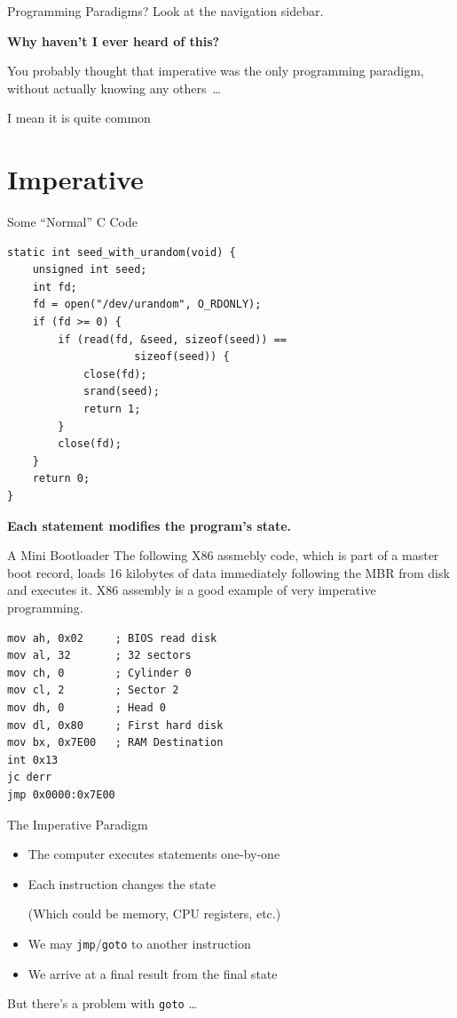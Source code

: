 \documentclass[aspectratio=169]{beamer}
\begin{document}
\begin{frame}{Programming Paradigms?}
	Look at the navigation sidebar.\pause

	\Large\textbf{Why haven't I ever heard of this?}

	\pause\normalsize

	You probably thought that imperative was the only programming paradigm, without actually knowing any others~\ldots

	\pause

	I mean it is quite common
\end{frame}


\section{Imperative}

\begin{frame}[fragile]{Some ``Normal'' C Code}
	\setlength{\parskip}{0ex}
	\small
	\begin{verbatim}
static int seed_with_urandom(void) {
	unsigned int seed;
	int fd;
	fd = open("/dev/urandom", O_RDONLY);
	if (fd >= 0) {
		if (read(fd, &seed, sizeof(seed)) ==
	        		sizeof(seed)) {
			close(fd);
			srand(seed);
			return 1;
		}
		close(fd);
	}
	return 0;
}
	\end{verbatim}
	\pause
	\textbf{Each statement modifies the program's state.}
\end{frame}

\begin{frame}[fragile]{A Mini Bootloader}
	The following X86 assmebly code, which is part of a master boot record, loads 16 kilobytes of data immediately following the MBR from disk and executes it. X86 assembly is a good example of very imperative programming.
	\begin{verbatim}
mov ah, 0x02     ; BIOS read disk
mov al, 32       ; 32 sectors
mov ch, 0        ; Cylinder 0
mov cl, 2        ; Sector 2
mov dh, 0        ; Head 0
mov dl, 0x80     ; First hard disk
mov bx, 0x7E00   ; RAM Destination
int 0x13
jc derr
jmp 0x0000:0x7E00
	\end{verbatim}
\end{frame}

\begin{frame}{The Imperative Paradigm}
	\begin{itemize}
		\item The computer executes statements one-by-one
		\item Each instruction changes the state

			(Which could be memory, CPU registers, etc.)
		\item We may \texttt{jmp}/\texttt{goto} to another instruction
		\item We arrive at a final result from the final state
	\end{itemize}

	\pause But there's a problem with \texttt{goto} \ldots
\end{frame}
\end{document}
